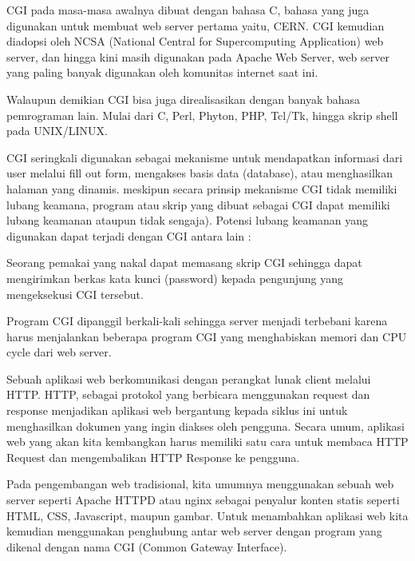 	\vspace{12pt}
	\noindent
	CGI pada masa-masa awalnya dibuat dengan bahasa C, bahasa yang juga digunakan untuk membuat web server pertama yaitu, CERN. CGI kemudian diadopsi oleh NCSA (National Central for Supercomputing Application) web server, dan hingga kini masih digunakan pada Apache Web Server, web server yang paling banyak digunakan oleh komunitas internet saat ini. \par
	\vspace{12pt}
	\noindent
	Walaupun demikian CGI bisa juga direalisasikan dengan banyak bahasa pemrograman lain. Mulai dari C, Perl, Phyton, PHP, Tcl/Tk, hingga skrip shell pada UNIX/LINUX. \par
	\vspace{12pt}
	\noindent
	CGI seringkali digunakan sebagai mekanisme untuk mendapatkan informasi dari user melalui fill out form, mengakses basis data (database), atau menghasilkan halaman yang dinamis. meskipun secara prinsip mekanisme CGI tidak memiliki lubang keamana, program atau skrip yang dibuat sebagai CGI dapat memiliki lubang keamanan ataupun tidak sengaja). Potensi lubang keamanan yang digunakan dapat terjadi dengan CGI antara lain : \par
	\noindent 
	\hspace*{0,5in}Seorang pemakai yang nakal dapat memasang skrip CGI sehingga dapat mengirimkan berkas kata kunci (password) kepada pengunjung yang mengeksekusi CGI tersebut. \par
		\noindent 
Program CGI dipanggil berkali-kali sehingga server menjadi terbebani karena harus menjalankan beberapa program CGI yang menghabiskan memori dan CPU cycle dari web server.
	\par
	\vspace{12pt}
	Sebuah aplikasi web berkomunikasi dengan perangkat lunak client melalui HTTP. HTTP, sebagai protokol yang berbicara menggunakan request dan response menjadikan aplikasi web bergantung kepada siklus ini untuk menghasilkan dokumen yang ingin diakses oleh pengguna. Secara umum, aplikasi web yang akan kita kembangkan harus memiliki satu cara untuk membaca HTTP Request dan mengembalikan HTTP Response ke pengguna. \par
	\vspace{12pt}
	Pada pengembangan web tradisional, kita umumnya menggunakan sebuah web server seperti Apache HTTPD atau nginx sebagai penyalur konten statis seperti HTML, CSS, Javascript, maupun gambar. Untuk menambahkan aplikasi web kita kemudian menggunakan penghubung antar web server dengan program yang dikenal dengan nama CGI (Common Gateway Interface). \par
